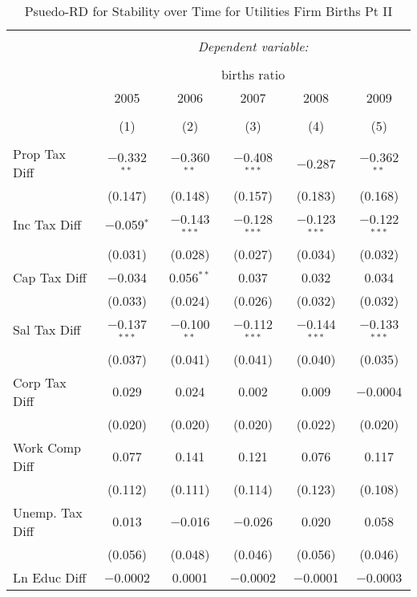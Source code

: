 
\begin{table}[!htbp] \centering 
  \caption{Psuedo-RD for Stability over Time for  Utilities Firm Births Pt II} 
  \label{22year} 
\small 
\begin{tabular}{@{\extracolsep{5pt}}lccccc} 
\\[-1.8ex]\hline 
\hline \\[-1.8ex] 
 & \multicolumn{5}{c}{\textit{Dependent variable:}} \\ 
\cline{2-6} 
\\[-1.8ex] & \multicolumn{5}{c}{births ratio} \\ 
 & 2005 & 2006 & 2007 & 2008 & 2009 \\ 
\\[-1.8ex] & (1) & (2) & (3) & (4) & (5)\\ 
\hline \\[-1.8ex] 
 Prop Tax Diff & $-$0.332$^{**}$ & $-$0.360$^{**}$ & $-$0.408$^{***}$ & $-$0.287 & $-$0.362$^{**}$ \\ 
  & (0.147) & (0.148) & (0.157) & (0.183) & (0.168) \\ 
  Inc Tax Diff & $-$0.059$^{*}$ & $-$0.143$^{***}$ & $-$0.128$^{***}$ & $-$0.123$^{***}$ & $-$0.122$^{***}$ \\ 
  & (0.031) & (0.028) & (0.027) & (0.034) & (0.032) \\ 
  Cap Tax Diff & $-$0.034 & 0.056$^{**}$ & 0.037 & 0.032 & 0.034 \\ 
  & (0.033) & (0.024) & (0.026) & (0.032) & (0.032) \\ 
  Sal Tax Diff & $-$0.137$^{***}$ & $-$0.100$^{**}$ & $-$0.112$^{***}$ & $-$0.144$^{***}$ & $-$0.133$^{***}$ \\ 
  & (0.037) & (0.041) & (0.041) & (0.040) & (0.035) \\ 
  Corp Tax Diff & 0.029 & 0.024 & 0.002 & 0.009 & $-$0.0004 \\ 
  & (0.020) & (0.020) & (0.020) & (0.022) & (0.020) \\ 
  Work Comp Diff & 0.077 & 0.141 & 0.121 & 0.076 & 0.117 \\ 
  & (0.112) & (0.111) & (0.114) & (0.123) & (0.108) \\ 
  Unemp. Tax Diff & 0.013 & $-$0.016 & $-$0.026 & 0.020 & 0.058 \\ 
  & (0.056) & (0.048) & (0.046) & (0.056) & (0.046) \\ 
  Ln Educ Diff & $-$0.0002 & 0.0001 & $-$0.0002 & $-$0.0001 & $-$0.0003 \\ 

\end{tabular}
\end{table}
